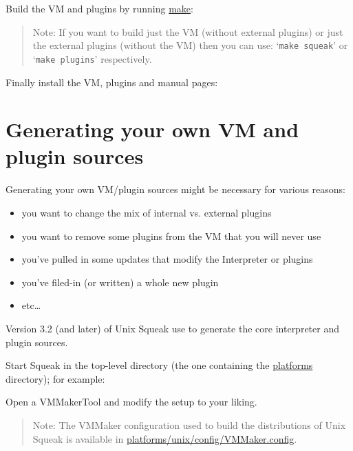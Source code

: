 \documentclass{article}
\newcommand{\cmd}{\url}
\newcommand{\cmd}{\texttt}
\newenvironment{note}{\begin{quote}\color{red} Note: }{\end{quote}}
\begin{document}
\noindent
Build the VM and plugins by running \cmd{make}:

\begin{note}
If you want to build just the VM (without external plugins) or just
the external plugins (without the VM) then you can use:
`\verb|make squeak|' or `\verb|make plugins|' respectively.
\end{note}

Finally install the VM, plugins and manual pages:


\section{Generating your own VM and plugin sources}

Generating your own VM/plugin sources might be necessary for various reasons:
\begin{itemize}
\item you want to change the mix of internal vs. external plugins
\item you want to remove some plugins from the VM that you will never use
\item you've pulled in some updates that modify the Interpreter or plugins
\item you've filed-in (or written) a whole new plugin
\item etc\ldots
\end{itemize}

Version 3.2 (and later) of Unix Squeak use
%
to generate the core interpreter and plugin sources.

Start Squeak in the top-level directory (the one containing the
\cmd{platforms} directory); for example:

Open a VMMakerTool and modify the setup to your liking.

\begin{note}
The VMMaker configuration used to build the distributions of Unix
Squeak is available in
\cmd{platforms/unix/config/VMMaker.config}.
\end{note}
\end{document}
